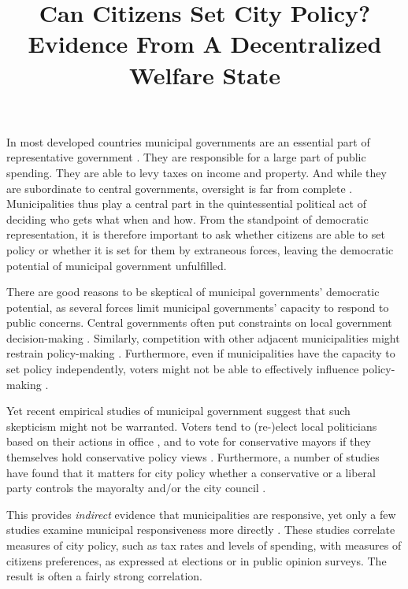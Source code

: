 \documentclass[a4paper,12pt]{article}
\title{\bigskip \bigskip \sffamily \LARGE{Can Citizens Set City Policy?} \\ \Large{ Evidence From A Decentralized Welfare State}}
\begin{document}
\noindent In most developed countries municipal governments are an essential part of representative government \citep{trounstine2009all,kersting2013reforming}. They are responsible for a large part of public spending.  They are able to levy taxes on income and property. And while they are subordinate to central governments, oversight is far from complete \citep{oecd2016subnational}. Municipalities thus play a central part in the quintessential political act of deciding who gets what when and how. From the standpoint of democratic representation, it is therefore important to ask whether citizens are able to set policy or whether it is set for them by extraneous forces, leaving the democratic potential of municipal government unfulfilled.


There are good reasons to be skeptical of municipal governments' democratic potential, as several forces limit municipal governments' capacity to respond to public concerns. Central governments often put constraints on local government decision-making \citep{peterson1981city}. Similarly, competition with other adjacent municipalities might restrain policy-making \citep{salmon2006horizontal}. Furthermore, even if municipalities have the capacity to set policy independently, voters might not be able to effectively influence policy-making \citep[e.g.,][]{gerber2011mayors}. 


Yet recent empirical studies of municipal government suggest that such skepticism might not be warranted. Voters tend to (re-)elect local politicians based on their actions in office \citep[e.g.,][]{boyne2009democracy,larsen2018relationship}, and to vote for conservative  mayors if they themselves hold conservative policy views  \citep{sances2017ideology,boudreau2015lost,hopkins2017retrospective}. Furthermore, a number of studies have found that it matters for city policy whether a conservative or a liberal party controls the mayoralty and/or the city council \citep[e.g.,][]{fiva2016power,blom2006parties,de2016mayoral}.  

This provides \textit{indirect} evidence that municipalities are responsive, yet only a few studies examine municipal responsiveness more directly \citep{tausanovitch2014representation,hajnal2010or,palus2010responsiveness,einstein2016pushing}. These studies correlate measures of city policy, such as tax rates and levels of spending, with measures of citizens preferences, as expressed at elections or in public opinion surveys. The result is often a fairly strong correlation. 
\end{document}
